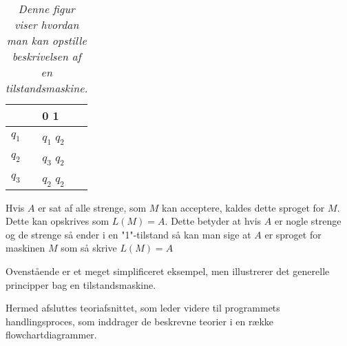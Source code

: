 \begin{table}[h]
    \centering
    \begin{threeparttable}
        \begin{tabular}{ l|l }
        \centering
            \multirow{1}{*} & 0 \hspace{2 mm} 1\\ \hline 
            \multirow{1}{*}{$q_1$} & $q_1$ \hspace{2 mm}  $q_2$\\
            \multirow{1}{*}{$q_2$} & $q_3$ \hspace{2 mm} $q_2$\\
            \multirow{1}{*}{$q_3$} & $q_2$ \hspace{2 mm} $q_2$
        \end{tabular}
    \end{threeparttable}
    \caption{\textit{Denne figur viser hvordan man kan opstille beskrivelsen af en tilstandsmaskine\cite{ComputationTheory}. \tabelgroup}}
    \label{tab:signs}
\end{table}

Hvis $A$ er sat af alle strenge, som $M$ kan acceptere, kaldes dette sproget for $M$. Dette kan opskrives som $L(M) = A$. Dette betyder at hvis $A$ er nogle strenge og de strenge så ender i en "1"-tilstand så kan man sige at $A$ er sproget for maskinen $M$ som så skrive $L(M) = A$ 

Ovenstående er et meget simplificeret eksempel, men illustrerer det generelle principper bag en tilstandsmaskine.

Hermed afsluttes teoriafsnittet, som leder videre til programmets handlingsproces, som inddrager de beskrevne teorier i en række flowchartdiagrammer.
